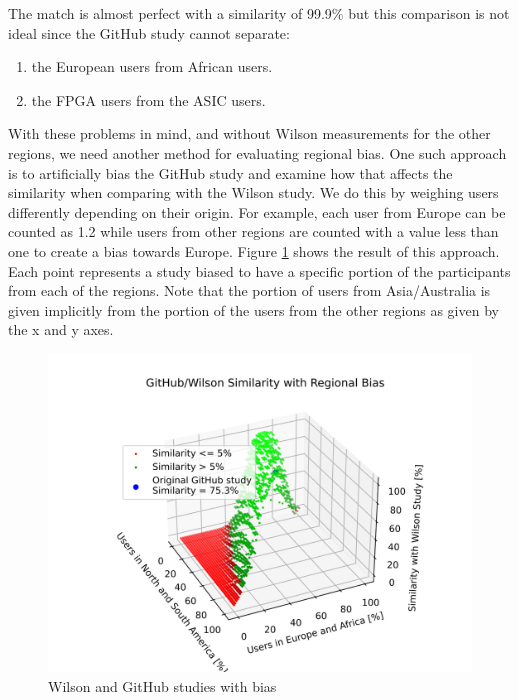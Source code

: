 \documentclass[]{article}
\providecommand{\tightlist}{%
  \setlength{\itemsep}{0pt}\setlength{\parskip}{0pt}}
\begin{document}
The match is almost perfect with a similarity of 99.9\% but this comparison is not ideal since the GitHub study cannot separate:

\begin{enumerate}
\def\labelenumi{\arabic{enumi}.}
\tightlist
\item
  the European users from African users.
\item
  the FPGA users from the ASIC users.
\end{enumerate}

With these problems in mind, and without Wilson measurements for the other regions, we need another method for evaluating regional bias. One such approach is to artificially bias the GitHub study and examine how that affects the similarity when comparing with the Wilson study. We do this by weighing users differently depending on their origin. For example, each user from Europe can be counted as 1.2 while users from other regions are counted with a value less than one to create a bias towards Europe. Figure \ref{fig:github-wilson-biased-comparison-2020} shows the result of this approach. Each point represents a study biased to have a specific portion of the participants from each of the regions. Note that the portion of users from Asia/Australia is given implicitly from the portion of the users from the other regions as given by the x and y axes.

\begin{figure}

{\centering \includegraphics[width=1\linewidth]{img/region_bias_similarity} 

}

\caption{Wilson and GitHub studies with bias}\label{fig:github-wilson-biased-comparison-2020}
\end{figure}
\end{document}
